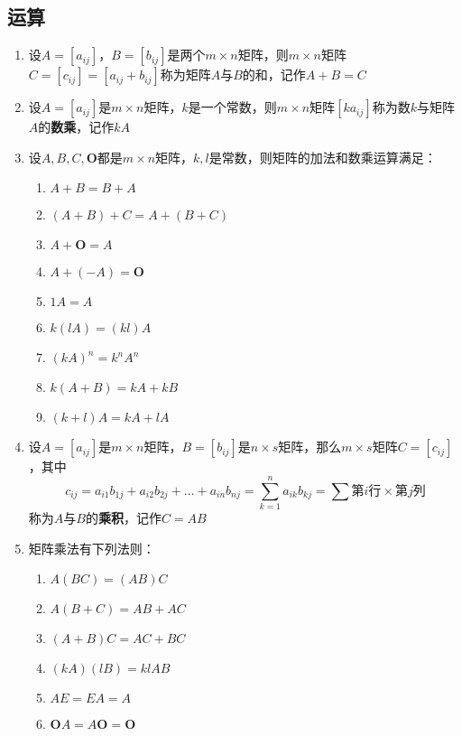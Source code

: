 \documentclass[a4paper,12pt]{article}
\begin{document}
    \subsection{运算}

    \begin{enumerate}
        \item 设$A = [a_{ij}]$，$B = [b_{ij}]$是两个$m \times n$矩阵，则$m \times n$矩阵$C = [c_{ij}] = [a_{ij} + b_{ij}]$称为矩阵$A$与$B$的和，记作$A + B = C$
        \item 设$A = [a_{ij}]$是$m \times n$矩阵，$k$是一个常数，则$m \times n$矩阵$[ka_{ij}]$称为数$k$与矩阵$A$的\textbf{数乘}，记作$kA$
        \item 设$A, B, C, \mathbf{O}$都是$m \times n$矩阵，$k, l$是常数，则矩阵的加法和数乘运算满足：
        \begin{enumerate}
            \item $A + B = B + A$
            \item $(A + B) + C = A + (B + C)$
            \item $A + \mathbf{O} = A$
            \item $A + (-A) = \mathbf{O}$
            \item $1A = A$
            \item $k(lA) = (kl)A$
            \item $(kA)^n = k^{n}A^n$
            \item $k(A + B) = kA + kB$
            \item $(k + l)A = kA + lA$
        \end{enumerate}
        \item 设$A = [a_{ij}]$是$m \times n$矩阵，$B = [b_{ij}]$是$n \times s$矩阵，那么$m \times s$矩阵$C = [c_{ij}]$，其中
        \[
            c_{ij} = a_{i1}b_{1j} + a_{i2}b_{2j} + \dots + a_{in}b_{nj} = \sum_{k=1}^{n} a_{ik}b_{kj} = \sum \text{第$i$行} \times \text{第$j$列}
        \]
        称为$A$与$B$的\textbf{乘积}，记作$C = AB$
        \item 矩阵乘法有下列法则：
        \begin{enumerate}
            \item $A(BC) = (AB)C$
            \item $A(B + C) = AB + AC$
            \item $(A + B)C = AC + BC$
            \item $(kA)(lB) = klAB$
            \item $AE = EA = A$
            \item $\mathbf{O}A = A\mathbf{O} = \mathbf{O}$

\end{enumerate}
\end{enumerate}
\end{document}
